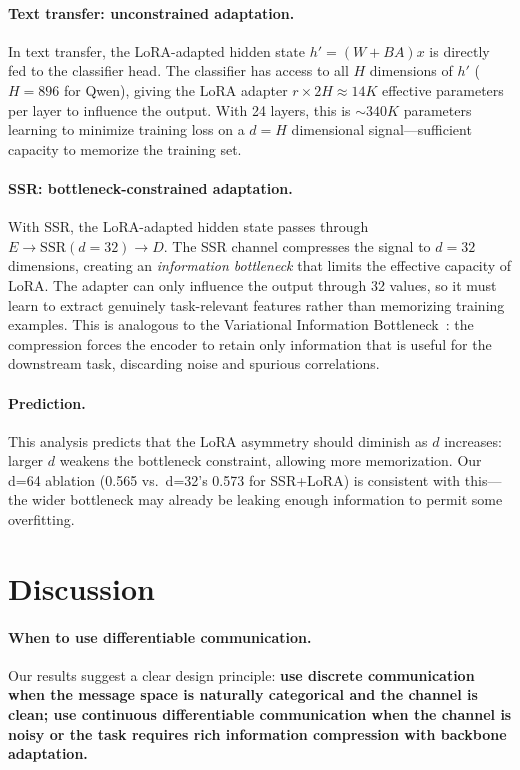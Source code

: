 \documentclass[11pt,a4paper]{article}
\begin{document}
\paragraph{Text transfer: unconstrained adaptation.}
In text transfer, the LoRA-adapted hidden state $h' = (W + BA)x$ is directly fed to the classifier head. The classifier has access to all $H$ dimensions of $h'$ ($H{=}896$ for Qwen), giving the LoRA adapter $r \times 2H \approx 14K$ effective parameters per layer to influence the output. With 24 layers, this is ${\sim}340K$ parameters learning to minimize training loss on a $d{=}H$ dimensional signal---sufficient capacity to memorize the training set.

\paragraph{SSR: bottleneck-constrained adaptation.}
With SSR, the LoRA-adapted hidden state passes through $E \to \mathrm{SSR}(d{=}32) \to D$. The SSR channel compresses the signal to $d{=}32$ dimensions, creating an \emph{information bottleneck} that limits the effective capacity of LoRA. The adapter can only influence the output through 32 values, so it must learn to extract genuinely task-relevant features rather than memorizing training examples. This is analogous to the Variational Information Bottleneck~\cite{tucker2022towards}: the compression forces the encoder to retain only information that is useful for the downstream task, discarding noise and spurious correlations.

\paragraph{Prediction.}
This analysis predicts that the LoRA asymmetry should diminish as $d$ increases: larger $d$ weakens the bottleneck constraint, allowing more memorization. Our d=64 ablation (0.565 vs.\ d=32's 0.573 for SSR+LoRA) is consistent with this---the wider bottleneck may already be leaking enough information to permit some overfitting.

\section{Discussion}

\paragraph{When to use differentiable communication.}
Our results suggest a clear design principle: \textbf{use discrete communication when the message space is naturally categorical and the channel is clean; use continuous differentiable communication when the channel is noisy or the task requires rich information compression with backbone adaptation.}
\end{document}
